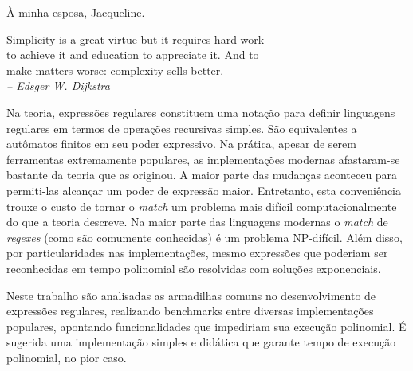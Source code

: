\documentclass[a4paper,12pt,oneside,onecolumn]{uerj}
\begin{document}
\renewcommand*{\lstlistingname}{Listagem}
\renewcommand*{\lstlistlistingname}{Lista de listagens}
\frontmatter
\capa
\folhaderosto

%

\begin{folhadeaprovacao}
\end{folhadeaprovacao}

  \vfill\vfill
    \hfill À minha esposa, Jacqueline.
  \vfill


\pretextualchapter{}

  \vfill\vfill\vfill\vfill
  \begin{flushright}
     Simplicity is a great virtue but it requires hard work\\
     to achieve it and education to appreciate it. And to \\
     make matters worse: complexity sells better.\\
    \textsl{-- Edsger W. Dijkstra}
  \end{flushright}
  \vfill




Na teoria, expressões regulares constituem uma notação para definir linguagens regulares em termos de operações recursivas simples. São equivalentes a autômatos finitos em seu poder expressivo. Na prática, apesar de serem ferramentas extremamente populares, as implementações modernas afastaram-se bastante da teoria que as originou. A maior parte das mudanças aconteceu para permiti-las alcançar um poder de expressão maior. Entretanto, esta conveniência trouxe o custo de tornar o \emph{match} um problema mais difícil computacionalmente do que a teoria descreve. Na maior parte das linguagens modernas o \emph{match} de \emph{regexes} (como são comumente conhecidas) é um problema NP-difícil. Além disso, por particularidades nas implementações, mesmo expressões que poderiam ser reconhecidas em tempo polinomial são resolvidas com soluções exponenciais. 

Neste trabalho são analisadas as armadilhas comuns no desenvolvimento de expressões regulares, realizando benchmarks entre diversas implementações populares, apontando funcionalidades que impediriam sua execução polinomial. É sugerida uma implementação simples e didática que garante tempo de execução polinomial, no pior caso.
\end{document}
